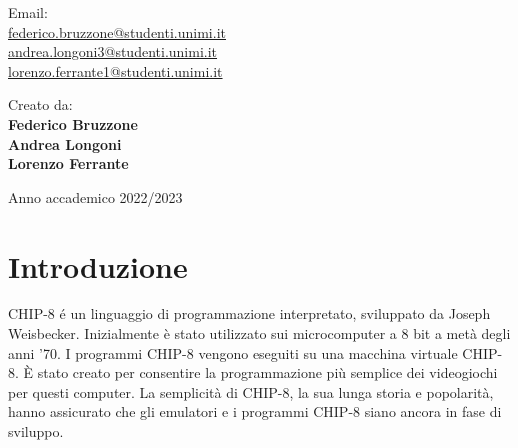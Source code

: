 \documentclass[a4paper]{article}
\begin{document}
\begin{titlepage}
\begin{center}
        \begin{minipage}[t]{0.47\textwidth}
	       {Email: } \vspace{0.3em} \\
              {\large \href{federico.bruzzone@studenti.unimi.it}{federico.bruzzone@studenti.unimi.it}} \vspace{1em}  \\
              {\large \href{andrea.longoni3@studenti.unimi.it}{andrea.longoni3@studenti.unimi.it}} \vspace{1em}  \\
              {\large \href{lorenzo.ferrante1@studenti.unimi.it}{lorenzo.ferrante1@studenti.unimi.it}} \vspace{1em}  \\
        \end{minipage}
        \hfill
        \begin{minipage}[t]{0.47\textwidth}\raggedleft
	       {Creato da:} \hspace{-0.9em} \vspace{0.3em} \\
              {\large \textbf{Federico Bruzzone}} \\
              \vspace{1em}
              {\large \textbf{Andrea Longoni}} \\
              \vspace{1em}
              {\large \textbf{Lorenzo Ferrante}} %
        \end{minipage}

        \vfill
        Anno accademico 2022/2023
            
    \end{center}
\end{titlepage}


\setlength{\parindent}{0pt}
\setlength{\parskip}{0.8em}
\linespread{1.5}




\section{Introduzione}

CHIP-8 é un linguaggio di programmazione interpretato, sviluppato da Joseph Weisbecker. Inizialmente è stato utilizzato sui microcomputer a 8 bit a metà degli anni '70. I programmi CHIP-8 vengono eseguiti su una macchina virtuale CHIP-8. È stato creato per consentire la programmazione più semplice dei videogiochi per questi computer. La semplicità di CHIP-8, la sua lunga storia e popolarità, hanno assicurato che gli emulatori e i programmi CHIP-8 siano ancora in fase di sviluppo.
\end{document}
